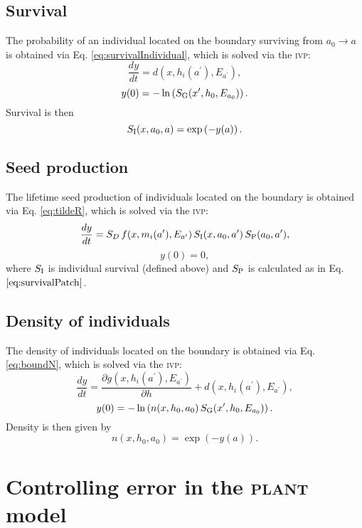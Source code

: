 \documentclass[10pt,twoside]{article}
\newcommand{\plant}{\textsc{plant}}
\begin{document}
\subsection{Survival}\label{survival}

The probability of an individual located on the boundary surviving from
\(a_0 \rightarrow a\) is obtained via Eq. \ref{eq:survivalIndividual},
which is solved via the \textsc{ivp}:
\[\frac{dy}{dt} = d(x,h_i(a^\prime), E_{a^\prime}),\]
\[ y(0) = - \ln\left(S_{\rm G} (x^\prime,h_0, E_{a_0})\right) .\]
Survival is then \[ S_{\rm I} (x, a_0, a) = \exp\left(- y(a) \right).\]

\subsection{Seed production}\label{seed-production}

The lifetime seed production of individuals located on the boundary is
obtained via Eq. \ref{eq:tildeR}, which is solved via the \textsc{ivp}:
\[\frac{dy}{dt} = S_D \,f(x, m_i(a^\prime), E_{a^\prime}) \, S_{\rm I} (x, a_0, a^\prime) \, S_{\rm P} (a_0,a^\prime),\]
\[ y(0) = 0,\] where \(S_{\rm I}\) is individual survival (defined
above) and \(S_{\rm P}\) is calculated as in Eq.
\(\ref{eq:survivalPatch}\).

\subsection{Density of individuals}\label{density-of-individuals}

The density of individuals located on the boundary is obtained via Eq.
\ref{eq:boundN}, which is solved via the \textsc{ivp}:
\[\frac{dy}{dt} = \frac{\partial g(x,h_i(a^\prime), E_{a^\prime})}{\partial h} +d(x,h_i(a^\prime),E_{a^\prime}),\]
\[ y(0) = -\ln\left(n(x,h_0 ,a_0) \, S_{\rm G} (x^\prime,h_0, E_{a_0}) \right).\]
Density is then given by \[n(x,h_0 ,a_0) =\exp(-y(a)).\]

\section{Controlling error in the {\plant} model}
\label{controlling-error-in-the-plant-model}
\end{document}
